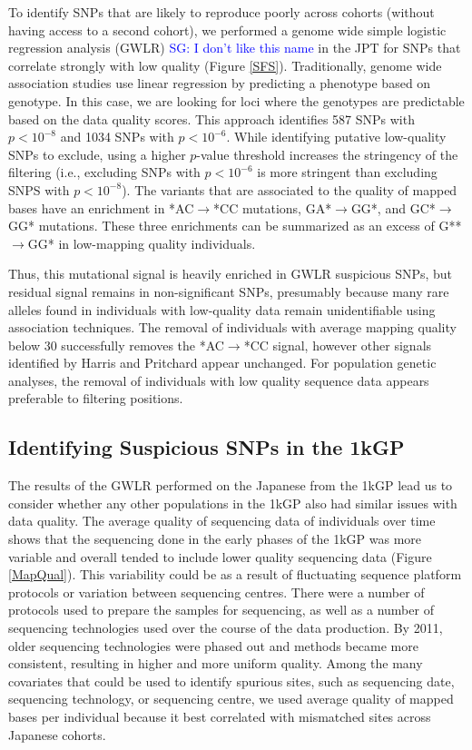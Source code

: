 \documentclass[9pt,lineno]{elife}
\newcommand{\sgcomment}[1]{\textcolor{blue}{SG: #1}}
\begin{document}
To identify SNPs that are likely to reproduce poorly across cohorts (without having access to a second cohort), we performed a genome wide simple logistic regression analysis (GWLR) \sgcomment{I don't like this name} in the JPT for SNPs that correlate strongly with low quality (Figure \ref{SFS}).
Traditionally, genome wide association studies use linear regression by predicting a phenotype based on genotype. 
In this case, we are looking for loci where the genotypes are predictable based on the data quality scores.
This approach identifies 587 SNPs with $p < 10^{-8}$ and 1034 SNPs with $ p < 10^{-6}$.
While identifying putative low-quality SNPs to exclude, using a higher $p$-value threshold increases the stringency of the filtering (i.e., excluding SNPs with $ p < 10^{-6}$ is more stringent than excluding SNPS with $p < 10^{-8}$). 
The variants that are associated to the quality of mapped bases have an enrichment in *AC${\rightarrow}$*CC mutations, GA*${\rightarrow}$GG*, and GC*${\rightarrow}$GG* mutations.
These three enrichments can be summarized as an excess of G**${\rightarrow}$GG* in low-mapping quality individuals.

Thus, this mutational signal is heavily enriched in GWLR suspicious SNPs, but residual signal remains in non-significant SNPs, presumably because many rare alleles found in individuals with low-quality data remain unidentifiable using association techniques. 
The removal of individuals with average mapping quality below 30 successfully removes the *AC${\rightarrow}$*CC signal, however other signals identified by Harris and Pritchard appear unchanged. 
For population genetic analyses, the removal of individuals with low quality sequence data appears preferable to filtering positions.

	\subsection{Identifying Suspicious SNPs in the 1kGP}
The results of the GWLR performed on the Japanese from the 1kGP lead us to consider whether any other populations in the 1kGP also had similar issues with data quality.
The average quality of sequencing data of individuals over time shows that the sequencing done in the early phases of the 1kGP was more variable and overall tended to include lower quality sequencing data (Figure \ref{MapQual}).
This variability could be as a result of fluctuating sequence platform protocols or variation between sequencing centres.
There were a number of protocols used to prepare the samples for sequencing, as well as a number of sequencing technologies used over the course of the data production.
By 2011, older sequencing technologies were phased out and methods became more consistent, resulting in higher and more uniform quality.
Among the many covariates that could be used to identify spurious sites, such as sequencing date, sequencing technology, or sequencing centre, we used average quality of mapped bases per individual because it best correlated with mismatched sites across Japanese cohorts.
\end{document}
